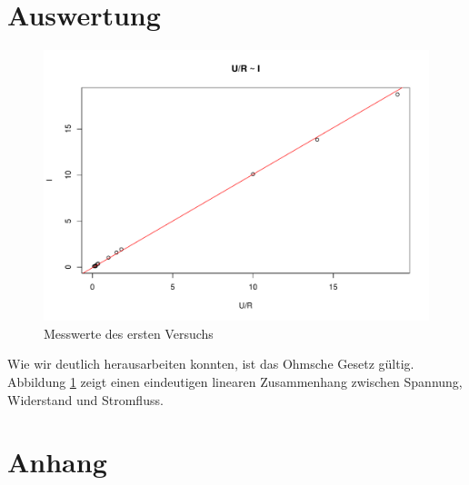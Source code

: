 \documentclass[a4paper,12pt]{article}
\begin{document}
\section{Auswertung}

\begin{figure}
 \begin{center}
 \includegraphics[scale=0.6]{R/plot.pdf}      
 \caption{Messwerte des ersten Versuchs}
 \label{fig:messwerte} 
 \end{center}
\end{figure}

Wie wir deutlich herausarbeiten konnten, ist das Ohmsche Gesetz gültig. Abbildung \ref{fig:messwerte} zeigt einen eindeutigen linearen Zusammenhang zwischen Spannung, Widerstand und Stromfluss. 

\section{Anhang}

\listoffigures
\end{document}
